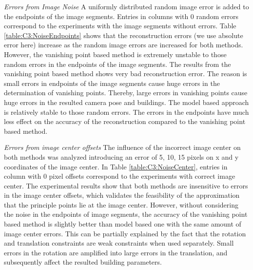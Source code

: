 {\it Errors from Image Noise} A uniformly distributed random image error is added to the endpoints of the image segments. Entries in columns with 0 random errors correspond to the experiments with the image segments without errors. Table \ref{table:C3:NoiseEndpoints} shows that the reconstruction errors (we use absolute error here) increase as the random image errors are increased for both methods. However, the vanishing point based method is extremely unstable to those random errors in the endpoints of the image segments. The results from the vanishing point based method shows  very bad reconstruction error. The reason is small errors in endpoints of the image segments cause huge errors in the determination of vanishing points. Thereby, large errors in vanishing points cause huge errors in the resulted camera pose and buildings. The model based approach is relatively stable to those random errors. The errors in the endpoints have much less effect on the accuracy of the reconstruction compared to the vanishing point based method. 


{\it Errors from image center offsets } The influence of the incorrect image center on both methods was analyzed introducing an error of 5, 10, 15 pixels on x and y coordinates of the image center. In Table \ref{table:C3:NoiseCenter}, entries in column with 0 pixel offsets correspond to the experiments with correct image center. The experimental results show that both methods are insensitive to errors in the image center offsets, which validates the feasibility of the approximation that the principle points lie at the image center. However, without considering the noise in the endpoints of image segments, the accuracy of the vanishing point based method is slightly better than model based one with the same amount of image center errors. This can be partially explained by the fact that the rotation and translation constraints are weak constraints when used separately. Small errors in the rotation are amplified into large errors in the translation, and subsequently affect the resulted building parameters.  

